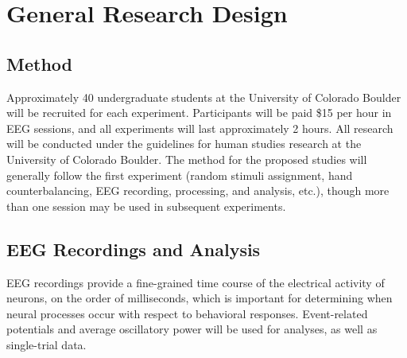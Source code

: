 
\section{General Research Design}

\subsection{Method}



Approximately 40 undergraduate students at the University of Colorado Boulder will be recruited for each experiment.  Participants will be paid \$15 per hour in EEG sessions, and all experiments will last approximately 2 hours.  All research will be conducted under the guidelines for human studies research at the University of Colorado Boulder.  The method for the proposed studies will generally follow the first experiment (random stimuli assignment, hand counterbalancing, EEG recording, processing, and analysis, etc.), though more than one session may be used in subsequent experiments.


\subsection{EEG Recordings and Analysis}

EEG recordings provide a fine-grained time course of the electrical
activity of neurons, on the order of milliseconds, which is important
for determining when neural processes occur with respect to behavioral
responses.  Event-related potentials and average oscillatory power will be used for analyses, as well as single-trial data.

